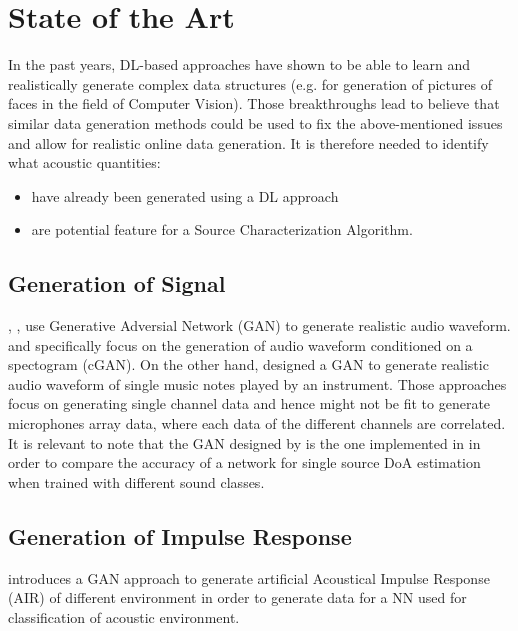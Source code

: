 \documentclass[11pt,a4paper,twoside]{report}
\begin{document}
\section{State of the Art}

In the past years, DL-based approaches have shown to be able to learn and realistically generate complex data structures (e.g. \cite{karras2017progressive} for generation of pictures of faces in the field of Computer Vision). Those breakthroughs lead to believe that similar data generation methods could be used to fix the above-mentioned issues and allow for realistic online data generation. It is therefore needed to identify what acoustic quantities:
\begin{itemize}
    \item have already been generated using a DL approach
    \item are potential feature for a Source Characterization Algorithm.
\end{itemize}

\subsection{Generation of Signal}

\cite{neekhara2019expediting}, \cite{NEURIPS2019_6804c9bc}, \cite{engel2019gansynth} use Generative Adversial Network (GAN) to generate realistic audio waveform. \cite{neekhara2019expediting} and \cite{NEURIPS2019_6804c9bc} specifically focus on the generation of audio waveform conditioned on a spectogram (cGAN). On the other hand, \cite{engel2019gansynth} designed a GAN to generate realistic audio waveform of single music notes played by an instrument. Those approaches focus on generating single channel data and hence might not be fit to generate microphones array data, where each data of the different channels are correlated. It is relevant to note that the GAN designed by \cite{neekhara2019expediting} is the one implemented in \cite{vargas2021improved} in order to compare the accuracy of a network for single source DoA estimation when trained with different sound classes.

\subsection{Generation of Impulse Response}

\cite{papayiannis2019data} introduces a GAN approach to generate artificial Acoustical Impulse Response (AIR) of different environment in order to generate data for a NN used for classification of acoustic environment.
\end{document}
